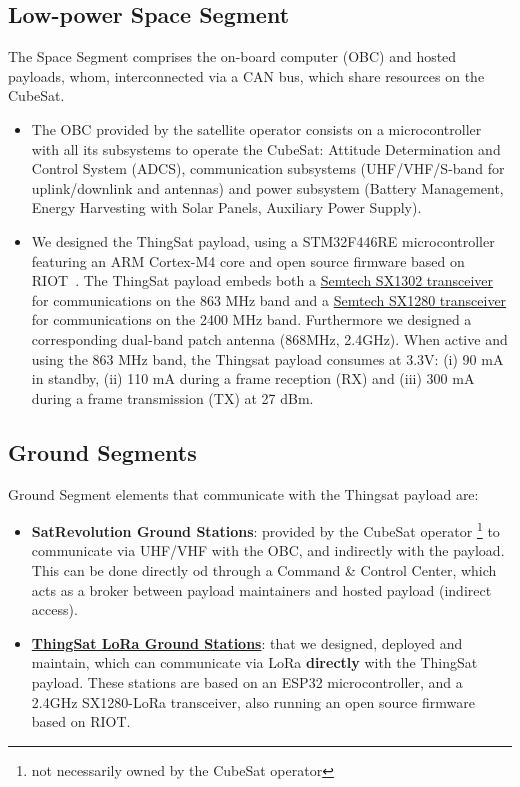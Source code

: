 \subsection*{Low-power Space Segment}
The Space Segment comprises the on-board computer (OBC) and hosted payloads, whom,
interconnected via a CAN bus, which share resources on the CubeSat.
\begin{itemize}
\item The OBC provided by the satellite operator consists on
a microcontroller with all its subsystems to operate the CubeSat:
Attitude Determination and Control System (ADCS),
communication subsystems (UHF/VHF/S-band for uplink/downlink and antennas) and
power subsystem (Battery Management, Energy Harvesting with Solar Panels, Auxiliary Power Supply).

\item We designed the ThingSat payload, using a STM32F446RE microcontroller featuring an ARM Cortex-M4 core
and open source firmware based on RIOT~\cite{baccelli2018riot}. The ThingSat payload embeds both a
\href{https://www.semtech.com/products/wireless-rf/lora-gateways/sx1302}{Semtech SX1302 transceiver} for
communications on the 863 MHz band and a \href{https://www.semtech.com/products/wireless-rf/24-ghz-transceivers/sx1280}{Semtech SX1280 transceiver}
for communications on the 2400 MHz band. Furthermore we designed a corresponding dual-band patch antenna (868MHz, 2.4GHz).
When active and using the 863 MHz band, the Thingsat payload consumes at 3.3V:
(i) 90 mA in standby,
(ii) 110 mA during a frame reception (RX) and
(iii) 300 mA during a frame transmission (TX) at 27 dBm.
\end{itemize}

\subsection*{Ground Segments}
Ground Segment elements that communicate with the Thingsat payload are:
\begin{itemize}
\item \textbf{SatRevolution Ground Stations}: provided by the CubeSat operator \footnote{not
necessarily owned by the CubeSat operator} to communicate via UHF/VHF with the OBC,
and indirectly with the payload. This can be done directly od through a Command \&
Control Center, which acts as a broker between payload maintainers and hosted payload
(indirect access).
\item \href{https://github.com/thingsat/tinygs_2g4station}{\textbf{ThingSat LoRa Ground Stations}}:
that we designed, deployed and maintain, which can communicate via LoRa \textbf{directly} with the
ThingSat payload. These stations are based on an ESP32 microcontroller, and a 2.4GHz SX1280-LoRa
transceiver, also running an open source firmware based on RIOT.
\end{itemize}

